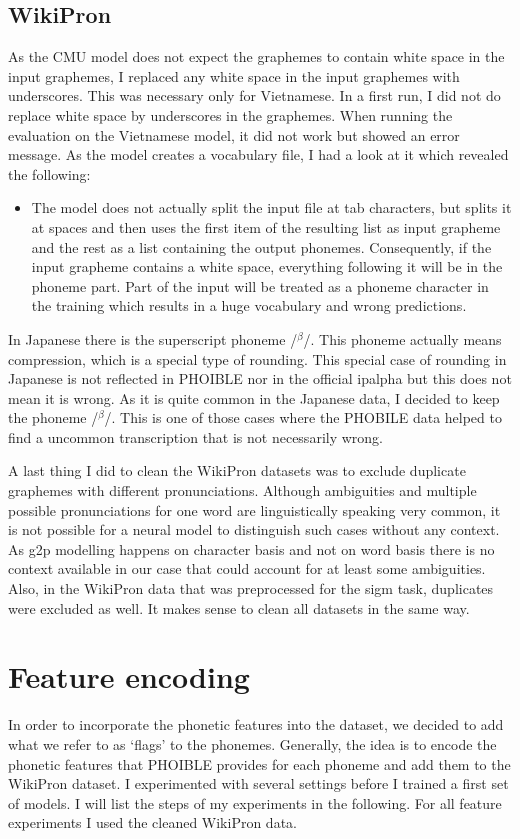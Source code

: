 \subsection*{WikiPron} 
As the CMU model does not expect the graphemes to contain white space in the input graphemes, I replaced any white space in the input graphemes with underscores. This was necessary only for Vietnamese. In a first run, I did not do replace white space by underscores in the graphemes. When running the evaluation on the Vietnamese model, it did not work but showed an error message. As the model creates a vocabulary file, I had a look at it which revealed the following: 
\begin{itemize}
\item The model does not actually split the input file at tab characters, but splits it at spaces and then uses the first item of the resulting list as input grapheme and the rest as a list containing the output phonemes. Consequently, if the input grapheme contains a white space, everything following it will be in the phoneme part. Part of the input will be treated as a phoneme character in the training which results in a huge vocabulary and wrong predictions.
\end{itemize}

In Japanese there is the superscript phoneme /$^\beta$/. This phoneme actually means compression, which is a special type of rounding. This special case of rounding in Japanese is not reflected in PHOIBLE nor in the official \ac{ipalpha} but this does not mean it is wrong. As it is quite common in the Japanese data, I decided to keep the phoneme /$^\beta$/. This is one of those cases where the PHOBILE data helped to find a uncommon transcription that is not necessarily wrong.

A last thing I did to clean the WikiPron datasets was to exclude duplicate graphemes with different pronunciations. Although ambiguities and multiple possible pronunciations for one word are linguistically speaking very common, it is not possible for a neural model to distinguish such cases without any context. As \ac{g2p} modelling happens on character basis and not on word basis there is no context available in our case that could account for at least some ambiguities. Also, in the WikiPron data that was preprocessed for the \ac{sigm} task, duplicates were excluded as well. It makes sense to clean all datasets in the same way.


\section{Feature encoding}
\label{sec:feature_enc}
In order to incorporate the phonetic features into the dataset, we decided to add what we refer to as `flags' to the phonemes. Generally, the idea is to encode the phonetic features that PHOIBLE provides for each phoneme and add them to the WikiPron dataset. I experimented with several settings before I trained a first set of models. I will list the steps of my experiments in the following. For all feature experiments I used the cleaned WikiPron data.

